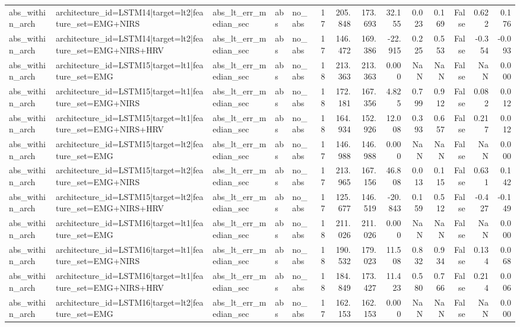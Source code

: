 \begin{table}
\begin{tabular}{lllllrrrrrrrrr}
abs_within_arch & architecture_id=LSTM14|target=lt2|feature_set=EMG+NIRS & abs_lt_err_median_sec & abs & no_abs & 17 & 205.848 & 173.693 & 32.155 & 0.023 & 0.169 & False & 0.622 & 0.176 \\
abs_within_arch & architecture_id=LSTM14|target=lt2|feature_set=EMG+NIRS+HRV & abs_lt_err_median_sec & abs & no_abs & 17 & 146.472 & 169.386 & -22.915 & 0.225 & 0.553 & False & -0.354 & -0.093 \\
abs_within_arch & architecture_id=LSTM15|target=lt1|feature_set=EMG & abs_lt_err_median_sec & abs & no_abs & 18 & 213.363 & 213.363 & 0.000 & NaN & NaN & False & NaN & 0.000 \\
abs_within_arch & architecture_id=LSTM15|target=lt1|feature_set=EMG+NIRS & abs_lt_err_median_sec & abs & no_abs & 18 & 172.181 & 167.356 & 4.825 & 0.799 & 0.912 & False & 0.082 & 0.012 \\
abs_within_arch & architecture_id=LSTM15|target=lt1|feature_set=EMG+NIRS+HRV & abs_lt_err_median_sec & abs & no_abs & 18 & 164.934 & 152.926 & 12.008 & 0.393 & 0.657 & False & 0.217 & 0.012 \\
abs_within_arch & architecture_id=LSTM15|target=lt2|feature_set=EMG & abs_lt_err_median_sec & abs & no_abs & 17 & 146.988 & 146.988 & 0.000 & NaN & NaN & False & NaN & 0.000 \\
abs_within_arch & architecture_id=LSTM15|target=lt2|feature_set=EMG+NIRS & abs_lt_err_median_sec & abs & no_abs & 17 & 213.965 & 167.156 & 46.808 & 0.013 & 0.115 & False & 0.631 & 0.142 \\
abs_within_arch & architecture_id=LSTM15|target=lt2|feature_set=EMG+NIRS+HRV & abs_lt_err_median_sec & abs & no_abs & 17 & 125.677 & 146.519 & -20.843 & 0.159 & 0.512 & False & -0.427 & -0.149 \\
abs_within_arch & architecture_id=LSTM16|target=lt1|feature_set=EMG & abs_lt_err_median_sec & abs & no_abs & 18 & 211.026 & 211.026 & 0.000 & NaN & NaN & False & NaN & 0.000 \\
abs_within_arch & architecture_id=LSTM16|target=lt1|feature_set=EMG+NIRS & abs_lt_err_median_sec & abs & no_abs & 18 & 190.532 & 179.023 & 11.508 & 0.832 & 0.934 & False & 0.134 & 0.068 \\
abs_within_arch & architecture_id=LSTM16|target=lt1|feature_set=EMG+NIRS+HRV & abs_lt_err_median_sec & abs & no_abs & 18 & 184.849 & 173.427 & 11.423 & 0.580 & 0.766 & False & 0.214 & 0.006 \\
abs_within_arch & architecture_id=LSTM16|target=lt2|feature_set=EMG & abs_lt_err_median_sec & abs & no_abs & 17 & 162.153 & 162.153 & 0.000 & NaN & NaN & False & NaN & 0.000 \\

\end{tabular}
\end{table}
